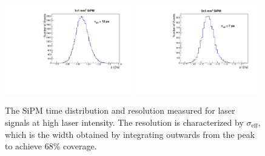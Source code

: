 \begin{figure}[htbp] 
\centering
\includegraphics[width=0.49\textwidth]{figures/DeltaT_LargeNPhotons_1x1SiPM.pdf} 
\includegraphics[width=0.49\textwidth]{figures/DeltaT_LargeNPhotons_3x3SiPM.pdf} 
\caption{The SiPM time distribution and resolution measured for laser signals at high laser intensity.
The resolution is characterized by $\sigma_{\mathrm{eff}}$, which is the width obtained by integrating
outwards from the peak to achieve $68\%$ coverage.
} 
\label{fig:LargeLightTimeResolution} 
\end{figure} 

